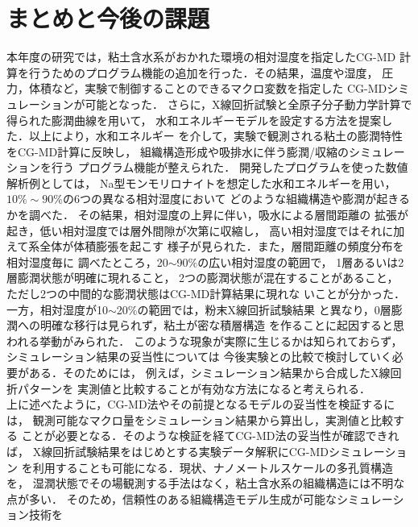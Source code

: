 ﻿\documentclass[11pt,a4j]{jarticle}
\begin{document}
\section{まとめと今後の課題}
本年度の研究では，粘土含水系がおかれた環境の相対湿度を指定したCG-MD
計算を行うためのプログラム機能の追加を行った．その結果，温度や湿度，
圧力，体積など，実験で制御することのできるマクロ変数を指定した
CG-MDシミュレーションが可能となった．
さらに，X線回折試験と全原子分子動力学計算で得られた膨潤曲線を用いて，
水和エネルギーモデルを設定する方法を提案した．以上により，水和エネルギー
を介して，実験で観測される粘土の膨潤特性をCG-MD計算に反映し，
組織構造形成や吸排水に伴う膨潤/収縮のシミュレーションを行う
プログラム機能が整えられた．
%
開発したプログラムを使った数値解析例としては，
Na型モンモリロナイトを想定した水和エネルギーを用い，
$10\%\sim 90\%$の6つの異なる相対湿度において
どのような組織構造や膨潤が起きるかを調べた．
その結果，相対湿度の上昇に伴い，吸水による層間距離の
拡張が起き，低い相対湿度では層外間隙が次第に収縮し，
高い相対湿度ではそれに加えて系全体が体積膨張を起こす
様子が見られた．また，層間距離の頻度分布を相対湿度毎に
調べたところ，20$\sim$90$\%$の広い相対湿度の範囲で，
1層あるいは2層膨潤状態が明確に現れること，
2つの膨潤状態が混在することがあること，
ただし2つの中間的な膨潤状態はCG-MD計算結果に現れな
いことが分かった．
一方，相対湿度が10$\sim$20$\%$の範囲では，粉末X線回折試験結果
と異なり，0層膨潤への明確な移行は見られず，粘土が密な積層構造
を作ることに起因すると思われる挙動がみられた．
このような現象が実際に生じるかは知られておらず，
シミュレーション結果の妥当性については
今後実験との比較で検討していく必要がある．そのためには，
例えば，シミュレーション結果から合成したX線回折パターンを
実測値と比較することが有効な方法になると考えられる．\\
%
\hspace{\parindent}
上に述べたように，CG-MD法やその前提となるモデルの妥当性を検証するには，
観測可能なマクロ量をシミュレーション結果から算出し，実測値と比較する
ことが必要となる．そのような検証を経てCG-MD法の妥当性が確認できれば，
X線回折試験結果をはじめとする実験データ解釈にCG-MDシミュレーション
を利用することも可能になる．現状、ナノメートルスケールの多孔質構造を，
湿潤状態でその場観測する手法はなく，粘土含水系の組織構造には不明な点が多い．
そのため，信頼性のある組織構造モデル生成が可能なシミュレーション技術を
\end{document}
